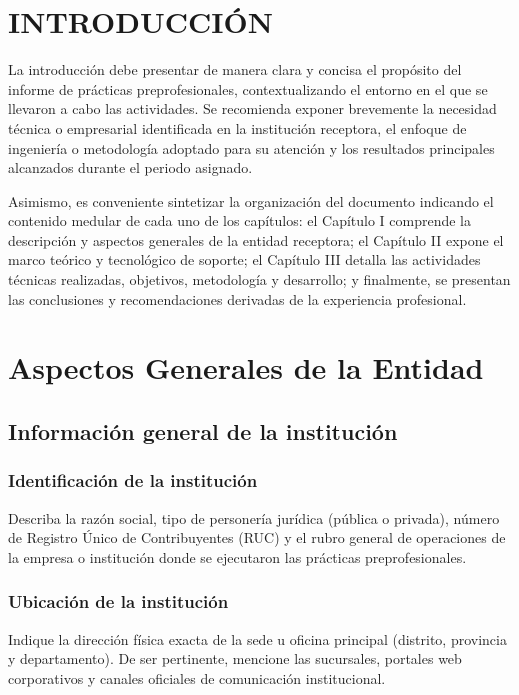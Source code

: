 
\section*{INTRODUCCIÓN}

La introducción debe presentar de manera clara y concisa el propósito del informe de prácticas preprofesionales, contextualizando el entorno en el que se llevaron a cabo las actividades. Se recomienda exponer brevemente la necesidad técnica o empresarial identificada en la institución receptora, el enfoque de ingeniería o metodología adoptado para su atención y los resultados principales alcanzados durante el periodo asignado.

Asimismo, es conveniente sintetizar la organización del documento indicando el contenido medular de cada uno de los capítulos: el Capítulo I comprende la descripción y aspectos generales de la entidad receptora; el Capítulo II expone el marco teórico y tecnológico de soporte; el Capítulo III detalla las actividades técnicas realizadas, objetivos, metodología y desarrollo; y finalmente, se presentan las conclusiones y recomendaciones derivadas de la experiencia profesional.

\section{Aspectos Generales de la Entidad}

\subsection{Información general de la institución}

\subsubsection{Identificación de la institución}
Describa la razón social, tipo de personería jurídica (pública o privada), número de Registro Único de Contribuyentes (RUC) y el rubro general de operaciones de la empresa o institución donde se ejecutaron las prácticas preprofesionales.

\subsubsection{Ubicación de la institución}
Indique la dirección física exacta de la sede u oficina principal (distrito, provincia y departamento). De ser pertinente, mencione las sucursales, portales web corporativos y canales oficiales de comunicación institucional.

